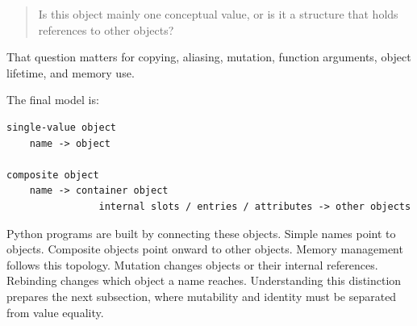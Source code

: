 \begin{quote}
Is this object mainly one conceptual value, or is it a structure that holds references to other objects?
\end{quote}

That question matters for copying, aliasing, mutation, function arguments, object lifetime, and memory use.

The final model is:

\begin{verbatim}
single-value object
    name -> object

composite object
    name -> container object
                internal slots / entries / attributes -> other objects
\end{verbatim}

Python programs are built by connecting these objects. Simple names point to objects. Composite objects point onward to other objects. Memory management follows this topology. Mutation changes objects or their internal references. Rebinding changes which object a name reaches. Understanding this distinction prepares the next subsection, where mutability and identity must be separated from value equality.